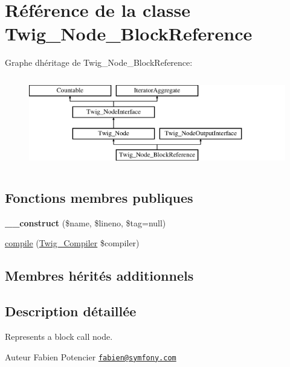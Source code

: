 \hypertarget{class_twig___node___block_reference}{}\section{Référence de la classe Twig\+\_\+\+Node\+\_\+\+Block\+Reference}
\label{class_twig___node___block_reference}
Graphe d\textquotesingle{}héritage de Twig\+\_\+\+Node\+\_\+\+Block\+Reference\+:\begin{figure}[H]
\begin{center}
\leavevmode
\includegraphics[height=4.000000cm]{class_twig___node___block_reference}
\end{center}
\end{figure}
\subsection*{Fonctions membres publiques}
\begin{DoxyCompactItemize}
\item 
{\bfseries \+\_\+\+\_\+construct} (\$name, \$lineno, \$tag=null)\hypertarget{class_twig___node___block_reference_a0028166bd229cdc2e0c0a79c4f3069fa}{}\label{class_twig___node___block_reference_a0028166bd229cdc2e0c0a79c4f3069fa}

\item 
\hyperlink{class_twig___node___block_reference_a4e0faa87c3fae583620b84d3607085da}{compile} (\hyperlink{class_twig___compiler}{Twig\+\_\+\+Compiler} \$compiler)
\end{DoxyCompactItemize}
\subsection*{Membres hérités additionnels}


\subsection{Description détaillée}
Represents a block call node.

\begin{DoxyAuthor}{Auteur}
Fabien Potencier \href{mailto:fabien@symfony.com}{\tt fabien@symfony.\+com} 
\end{DoxyAuthor}


